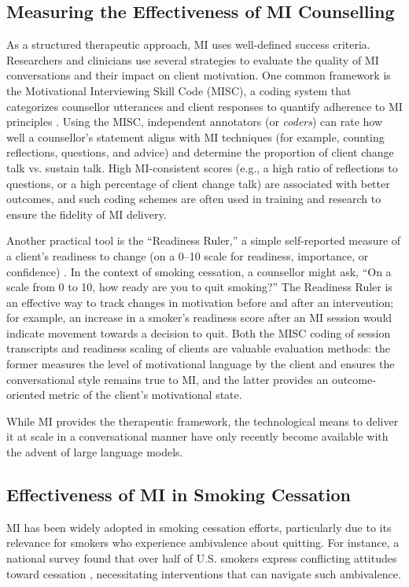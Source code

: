 \subsection*{Measuring the Effectiveness of MI Counselling}
As a structured therapeutic approach, MI uses well-defined success criteria. Researchers and clinicians use several strategies to evaluate the quality of MI conversations and their impact on client motivation. One common framework is the Motivational Interviewing Skill Code (MISC), a coding system that categorizes counsellor utterances and client responses to quantify adherence to MI principles \cite{Houck2010}. Using the MISC, independent annotators (or \emph{coders}) can rate how well a counsellor's statement aligns with MI techniques (for example, counting reflections, questions, and advice) and determine the proportion of client change talk vs. sustain talk. High MI-consistent scores (e.g., a high ratio of reflections to questions, or a high percentage of client change talk) are associated with better outcomes, and such coding schemes are often used in training and research to ensure the fidelity of MI delivery.

Another practical tool is the ``Readiness Ruler,'' a simple self-reported measure of a client’s readiness to change (on a 0–10 scale for readiness, importance, or confidence) \cite{Boudreaux2012}. In the context of smoking cessation, a counsellor might ask, ``On a scale from 0 to 10, how ready are you to quit smoking?'' The Readiness Ruler is an effective way to track changes in motivation before and after an intervention; for example, an increase in a smoker's readiness score after an MI session would indicate movement towards a decision to quit. Both the MISC coding of session transcripts and readiness scaling of clients are valuable evaluation methods: the former measures the level of motivational language by the client and ensures the conversational style remains true to MI, and the latter provides an outcome-oriented metric of the client’s motivational state.

While MI provides the therapeutic framework, the technological means to deliver it at scale in a conversational manner have only recently become available with the advent of large language models.

\subsection{Effectiveness of MI in Smoking Cessation}
MI has been widely adopted in smoking cessation efforts, particularly due to its relevance for smokers who experience ambivalence about quitting. For instance, a national survey found that over half of U.S. smokers express conflicting attitudes toward cessation \cite{Babb2017}, necessitating interventions that can navigate such ambivalence.

